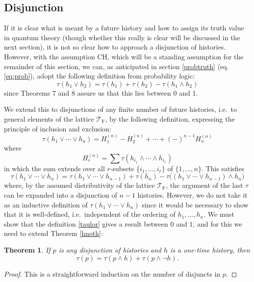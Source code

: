 \documentclass[12pt,reqno]{article}
\renewcommand{\(}{\left(}
\renewcommand{\)}{\right)}
\newcommand{\TF}{\mathcal{T}_\text{F}}
\newcommand{\<}{\langle}
\renewcommand{\>}{\rangle}
\newcommand{\be}{\begin{equation}}
\newcommand{\ee}{\end{equation}}
\theoremstyle{plain} %
\newtheorem{thm}{Theorem}
\begin{document}
\subsection{Disjunction}
\label{subsec:disjunction}

If it is clear what is meant by a future history and how to assign its truth value in quantum theory (though whether this really is clear will be discussed in the next section), it is not so clear how to approach a disjunction of histories. However, with the assumption CH, which will be a standing assumption for the remainder of this section, we can, as anticipated in section \ref{probtruth} (eq. \eqref{eq:prob}),  adopt the following definition from probability logic:
\be\label{truthdisj}
\tau(h_1\lor h_2) = \tau(h_1) + \tau(h_2) - \tau(h_1\land h_2)
\ee
since Theorems 7 and 8 assure us that this lies between 0 and 1.

We extend this to disjunctions of any finite number of future histories, i.e.\ to general elements of the lattice $\TF$, by the following definition, expressing the principle of inclusion and exclusion:
\be\label{taulor}
\tau(h_1\lor\cdots\lor h_n) = H^{(n)}_1 - H^{(n)}_2 + \cdots + (-)^{n-1}H^{(n)}_n
\ee
where
\be\label{H}
H^{(n)}_r = \sum\tau(h_{i_1}\land\cdots\land h_{i_r})
\ee
in which the sum extends over all $r$-subsets $\{i_1,\ldots,i_r\}$ of $\{1,\ldots ,n\}$.
This satisfies 
\be\label{disjinduction}
\tau(h_1\lor\cdots\lor h_n) = \tau(h_1\lor\cdots\lor h_{n-1}) + \tau(h_n) - \tau\big( (h_1\lor\cdots\lor h_{n-1})\land h_n\big)
\ee
where, by the assumed distributivity of the lattice $\TF$, the argument of the last $\tau$ can be expanded into a disjunction of $n-1$ histories. However, we do not take it as an inductive definition of $\tau(h_1\lor\cdots\lor h_n)$ since it would be necessary to show that it is well-defined, i.e.\ independent of the ordering of $h_1,\ldots,h_n$. We must show that the definition \eqref{taulor} gives a result between $0$ and $1$, and for this we need to extend Theorem \ref{hnoth}:
\begin{thm}\label{genhnoth}
If $p$ is any disjunction of histories and $h$ is a one-time history, then
\[
\tau(p) = \tau(p\land h) + \tau(p\land\lnot h).
\]
\end{thm}
\begin{proof}
This is a straightforward induction on the number of disjuncts in $p$.
\end{proof}
\end{document}
